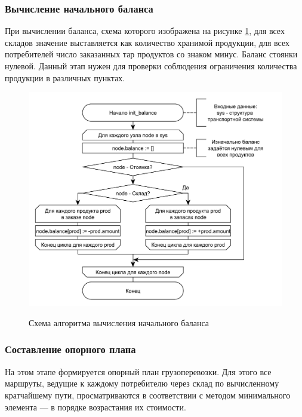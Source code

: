 \subsubsection{Вычисление начального баланса}
При вычислении баланса, схема которого изображена на рисунке \ref{alg:balance}, для всех складов значение выставляется как количество хранимой продукции, для всех потребителей число заказанных тар продуктов со знаком минус. Баланс стоянки нулевой. Данный этап нужен для проверки соблюдения ограничения количества продукции в различных пунктах. 

\pagebreak
\begin{figure}[h]
	\begin{center}
		{\includegraphics[scale=0.7, angle=0, page=1]{img/init_balance.pdf}}
		\caption{Схема алгоритма вычисления начального баланса}
		\label{alg:balance}
	\end{center}
\end{figure}

\subsubsection{Составление опорного плана}
На этом этапе формируется опорный план грузоперевозки. Для этого все маршруты, ведущие к каждому потребителю через склад по вычисленному кратчайшему пути, просматриваются в соответствии с методом минимального элемента --- в порядке возрастания их стоимости. 

